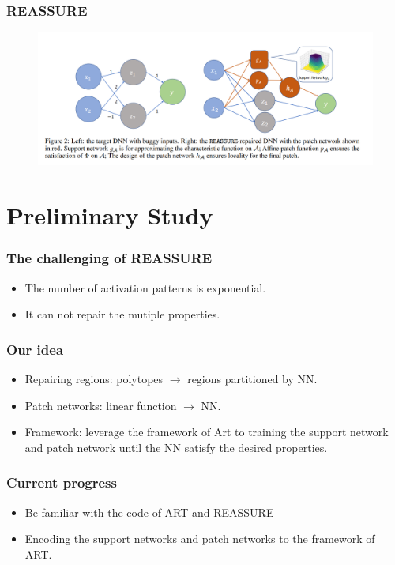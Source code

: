 \documentclass[aspectratio=169%
,serif,mathserif]{beamer}
\begin{document}
\begin{frame}
	\frametitle{REASSURE}
	\begin{figure}[htbp]
		\includegraphics[width=.9\linewidth]{2.png}
	\end{figure}
\end{frame}


\section{Preliminary Study}
\begin{frame}
	\frametitle{The challenging of REASSURE}
	\begin{itemize}
		\item The number of activation patterns is exponential.
		\item It can not repair the mutiple properties. 
	\end{itemize}
\end{frame}



\begin{frame}
	\frametitle{Our idea}
	\begin{itemize}
		\item Repairing regions: polytopes $\to$ regions partitioned by NN.
		\item Patch networks: linear function $\to$ NN.
		\item Framework: leverage the framework of Art to training the support network and patch network until the NN satisfy the desired properties.
	\end{itemize}
\end{frame}

\begin{frame}
	\frametitle{Current progress}
	\begin{itemize}
		\item Be familiar with the code of ART and REASSURE
		\item Encoding the support networks and patch networks to the framework of ART.
	\end{itemize}
\end{frame}
\end{document}
